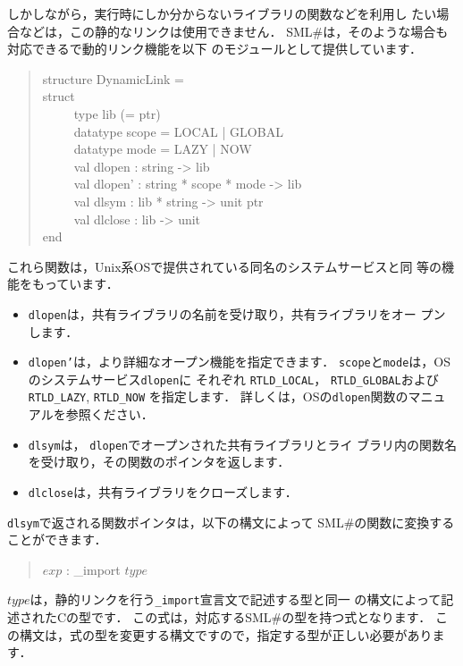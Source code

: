 \documentclass{jbook}
\newcommand{\smlsharp}{SML\#}
\newenvironment{program}{\begin{tt}\begin{quote}}{\end{quote}\end{tt}}
\newcommand{\myem}{\ \ \ \ \  }
\begin{document}
	しかしながら，実行時にしか分からないライブラリの関数などを利用し
たい場合などは，この静的なリンクは使用できません．
	\smlsharp{}は，そのような場合も対応できるで動的リンク機能を以下
のモジュールとして提供しています．
\begin{program}
structure DynamicLink =\\
struct\\
\myem  type lib (= ptr)\\
\myem  datatype scope = LOCAL | GLOBAL\\
\myem  datatype mode = LAZY | NOW\\
\myem  val dlopen : string -> lib\\
\myem  val dlopen' : string * scope * mode -> lib\\
\myem  val dlsym : lib * string -> unit ptr\\
\myem  val dlclose : lib -> unit\\
end
\end{program}
	これら関数は，Unix系OSで提供されている同名のシステムサービスと同
等の機能をもっています．
\begin{itemize}
\item  {\tt dlopen}は，共有ライブラリの名前を受け取り，共有ライブラリをオー
プンします．
\item  {\tt dlopen'}は，より詳細なオープン機能を指定できます．
	{\tt scope}と{\tt mode}は，OSのシステムサービス{\tt dlopen}に
それぞれ
{\tt RTLD\_LOCAL}，
{\tt RTLD\_GLOBAL}および
{\tt RTLD\_LAZY},
{\tt RTLD\_NOW}
を指定します．
	詳しくは，OSの{\tt dlopen}関数のマニュアルを参照ください．
\item {\tt dlsym}は， {\tt dlopen}でオープンされた共有ライブラリとライ
ブラリ内の関数名を受け取り，その関数のポインタを返します．
\item  {\tt dlclose}は，共有ライブラリをクローズします．
\end{itemize}
	{\tt dlsym}で返される関数ポインタは，以下の構文によって
\smlsharp{}の関数に変換することができます．
\begin{program}
$exp$ : \_import  $type$
\end{program}
	$type$は，静的リンクを行う{\tt \_import}宣言文で記述する型と同一
の構文によって記述されたCの型です．
	この式は，対応する\smlsharp{}の型を持つ式となります．
	この構文は，式の型を変更する構文ですので，指定する型が正しい必要があります．
\end{document}
